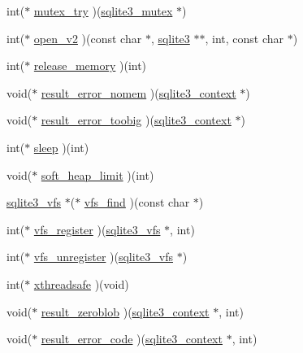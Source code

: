 \begin{DoxyCompactItemize}
int($\ast$ \hyperlink{structsqlite3__api__routines_aa3eed04dafa14724d23f3e74a6891575}{mutex\+\_\+try} )(\hyperlink{sqlite3_8h_a0f546860bde03fddb33a9fed920da05c}{sqlite3\+\_\+mutex} $\ast$)
\item 
int($\ast$ \hyperlink{structsqlite3__api__routines_a1e6684ec7752ca3aea64da0049490083}{open\+\_\+v2} )(const char $\ast$, \hyperlink{sqlite3_8h_a0ef6f2646262c8a9b24368d8ac140f69}{sqlite3} $\ast$$\ast$, int, const char $\ast$)
\item 
int($\ast$ \hyperlink{structsqlite3__api__routines_a34fba43ed54a03e129804659ccb379d1}{release\+\_\+memory} )(int)
\item 
void($\ast$ \hyperlink{structsqlite3__api__routines_a51e4c10c9ad6aa8b2925cac3b07db982}{result\+\_\+error\+\_\+nomem} )(\hyperlink{sqlite3_8h_a3b519553ffec8fc42b2356f5b1ebdc57}{sqlite3\+\_\+context} $\ast$)
\item 
void($\ast$ \hyperlink{structsqlite3__api__routines_a8d8d0f8b76631dc4c976caf8e4b69714}{result\+\_\+error\+\_\+toobig} )(\hyperlink{sqlite3_8h_a3b519553ffec8fc42b2356f5b1ebdc57}{sqlite3\+\_\+context} $\ast$)
\item 
int($\ast$ \hyperlink{structsqlite3__api__routines_a87cb2a664bb94f1a96fd4c3bf02a5e25}{sleep} )(int)
\item 
void($\ast$ \hyperlink{structsqlite3__api__routines_a720a37e18110008f32c32b43e6df7bd6}{soft\+\_\+heap\+\_\+limit} )(int)
\item 
\hyperlink{structsqlite3__vfs}{sqlite3\+\_\+vfs} $\ast$($\ast$ \hyperlink{structsqlite3__api__routines_a86ef5c166aac6ae6fe3ccbdaca51509b}{vfs\+\_\+find} )(const char $\ast$)
\item 
int($\ast$ \hyperlink{structsqlite3__api__routines_a9dcb6d9f177c3669ed33323ad403533d}{vfs\+\_\+register} )(\hyperlink{structsqlite3__vfs}{sqlite3\+\_\+vfs} $\ast$, int)
\item 
int($\ast$ \hyperlink{structsqlite3__api__routines_a9b7990440de7637d0279b90e6cdaab23}{vfs\+\_\+unregister} )(\hyperlink{structsqlite3__vfs}{sqlite3\+\_\+vfs} $\ast$)
\item 
int($\ast$ \hyperlink{structsqlite3__api__routines_a965bd76d061a5f47729a6c96faac3aa2}{xthreadsafe} )(void)
\item 
void($\ast$ \hyperlink{structsqlite3__api__routines_a9bd6a486d3a06555e019e02ab269439c}{result\+\_\+zeroblob} )(\hyperlink{sqlite3_8h_a3b519553ffec8fc42b2356f5b1ebdc57}{sqlite3\+\_\+context} $\ast$, int)
\item 
void($\ast$ \hyperlink{structsqlite3__api__routines_aef0ea817c076999387222eb34cba23ba}{result\+\_\+error\+\_\+code} )(\hyperlink{sqlite3_8h_a3b519553ffec8fc42b2356f5b1ebdc57}{sqlite3\+\_\+context} $\ast$, int)
$$
\end{DoxyCompactItemize}
